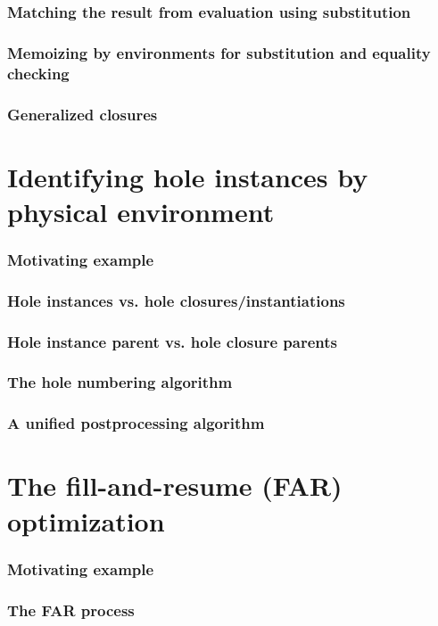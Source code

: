 \documentclass{beamer}
\begin{document}
\begin{frame}
  \frametitle{Matching the result from evaluation using substitution}

\end{frame}

\begin{frame}
  \frametitle{Memoizing by environments for substitution and equality checking}

\end{frame}

\begin{frame}
  \frametitle{Generalized closures}

\end{frame}

\section{Identifying hole instances by physical environment}

\begin{frame}
  \frametitle{Motivating example}
\end{frame}

\begin{frame}
  \frametitle{Hole instances vs. hole closures/instantiations}
\end{frame}

\begin{frame}
  \frametitle{Hole instance parent vs. hole closure parents}
\end{frame}

\begin{frame}
  \frametitle{The hole numbering algorithm}
\end{frame}

\begin{frame}
  \frametitle{A unified postprocessing algorithm}
\end{frame}

\section{The fill-and-resume (FAR) optimization}

\begin{frame}
  \frametitle{Motivating example}
\end{frame}

\begin{frame}
  \frametitle{The FAR process}
\end{frame}
\end{document}
